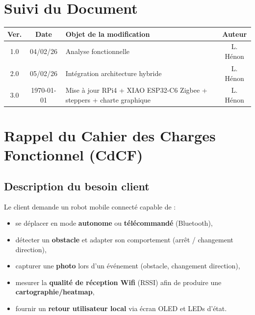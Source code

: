 \documentclass[a4paper,12pt]{report}
\begin{document}
\thispagestyle{empty}
\chapter*{Suivi du Document}
\begin{center}
    \begin{tabular}{|c|c|p{8cm}|c|}
    \hline
    \rowcolor{UTGreen!20} \textbf{Ver.} & \textbf{Date} & \textbf{Objet de la modification} & \textbf{Auteur} \\ \hline
    1.0 & 04/02/26 & Analyse fonctionnelle & L. Hénon \\ \hline
    2.0 & 05/02/26 & Intégration architecture hybride & L. Hénon \\ \hline
    3.0 & \today & Mise à jour RPi4 + XIAO ESP32-C6 Zigbee + steppers + charte graphique & L. Hénon \\ \hline
    \end{tabular}
\end{center}

\newpage
\tableofcontents
\newpage

\chapter{Rappel du Cahier des Charges Fonctionnel (CdCF)}

\section{Description du besoin client}
Le client demande un robot mobile connecté capable de :
\begin{itemize}
    \item se déplacer en mode \textbf{autonome} ou \textbf{télécommandé} (Bluetooth),
    \item détecter un \textbf{obstacle} et adapter son comportement (arrêt / changement direction),
    \item capturer une \textbf{photo} lors d’un événement (obstacle, changement direction),
    \item mesurer la \textbf{qualité de réception Wifi} (RSSI) afin de produire une \textbf{cartographie/heatmap},
    \item fournir un \textbf{retour utilisateur local} via écran OLED et LEDs d’état.
\end{itemize}
\end{document}
